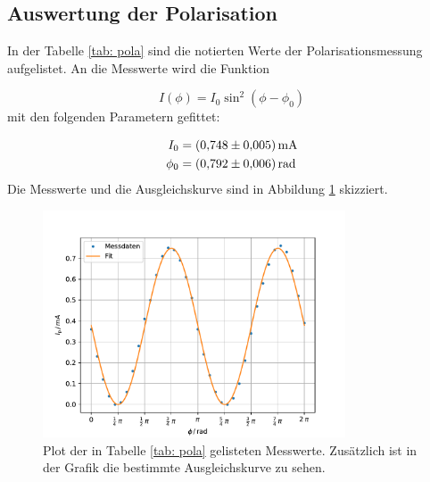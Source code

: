 \subsection{Auswertung der Polarisation}

In der Tabelle \ref{tab: pola} sind die notierten Werte der Polarisationsmessung
aufgelistet.
\FloatBarrier
An die Messwerte wird die Funktion %

\begin{equation}
  \label{eq: func_polarisation}
  I(\phi)=I_0\sin^2\left(\phi-\phi_0\right)
\end{equation}
mit den folgenden Parametern gefittet:

\begin{align}
  \label{eq: fit_pola}
  \begin{aligned}
  I_0&=\SI{0.748\pm0.005}{\milli\ampere}\\ %
  \phi_0&=\SI{0.792\pm0.006}{\radian}
\end{aligned}
\end{align}
Die Messwerte und die Ausgleichskurve sind in Abbildung \ref{fig: pola} skizziert.

\begin{figure}[h!]
  \centering
  \includegraphics[width=0.8\textwidth]{../Messdaten/plots/pola.pdf}
  \caption{Plot der in Tabelle \ref{tab: pola} gelisteten Messwerte. Zusätzlich ist in der Grafik die bestimmte Ausgleichskurve zu sehen.}
  \label{fig: pola}
\end{figure}
\FloatBarrier

\FloatBarrier
